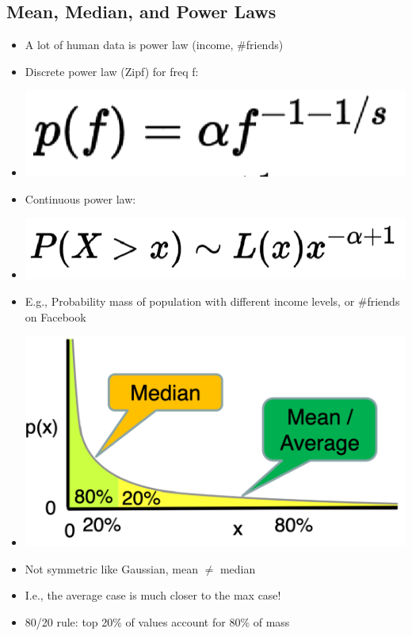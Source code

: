 \documentclass[11pt]{article}
\theoremstyle{definition}
\begin{document}
\subsection{Mean, Median, and Power Laws}
\begin{itemize}
  \item A lot of human data is power law (income, \#friends)
  \item Discrete power law (Zipf) for freq f:
  \item \includegraphics[width=\textwidth/5]{18.png}
  \item Continuous power law:
  \item \includegraphics[width=\textwidth/4]{19.png}
  \item E.g., Probability
  mass of
  population with
  different income
  levels, or \#friends
  on Facebook
  \item \includegraphics[width=\textwidth/2]{20.png}
  \item Not symmetric like Gaussian, mean $\neq$ median
  \item I.e., the average case is much closer to the max case!
  \item 80/20 rule: top 20\% of values account for 80\% of mass
\end{itemize}
\end{document}
